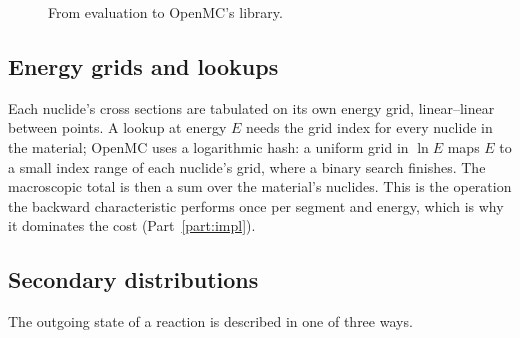 \begin{figure}[t]\centering
{}
\caption{From evaluation to OpenMC's library.}\label{fig:nd:pipeline}
\end{figure}

\subsection{Energy grids and lookups}

Each nuclide's cross sections are tabulated on its own energy grid, linear--linear between points.
A lookup at energy $E$ needs the grid index for every nuclide in the material; OpenMC uses a
logarithmic hash: a uniform grid in $\ln E$ maps $E$ to a small index range of each nuclide's grid,
where a binary search finishes. The macroscopic total is then a sum over the material's nuclides.
This is the operation the backward characteristic performs once per segment and energy, which is
why it dominates the cost (Part~\ref{part:impl}).

\subsection{Secondary distributions}

The outgoing state of a reaction is described in one of three ways.

